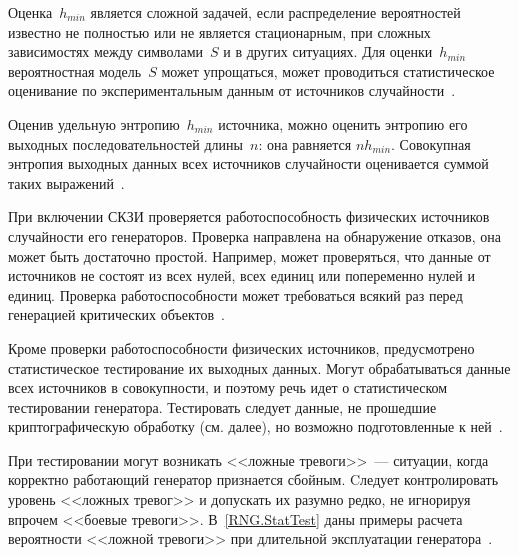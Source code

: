 Оценка~$h_{min}$ является сложной задачей, если распределение вероятностей 
известно не полностью или не является стационарным,
при сложных зависимостях между символами~$S$ и в других ситуациях.
%
Для оценки~$h_{min}$ вероятностная модель~$S$ может упрощаться,
может проводиться статистическое оценивание по экспериментальным
данным от источников случайности~.

Оценив удельную энтропию~$h_{min}$ источника, можно оценить 
энтропию его выходных последовательностей длины~$n$: она равняется 
$n h_{min}$. Совокупная энтропия выходных данных всех источников 
случайности оценивается суммой таких выражений~.

При включении СКЗИ проверяется работоспособность физических источников 
случайности его генераторов. Проверка направлена на обнаружение отказов, она 
может быть достаточно простой. Например, может проверяться, что данные от 
источников не состоят из всех нулей, всех единиц или попеременно нулей и 
единиц.
%
Проверка работоспособности может требоваться всякий раз перед генерацией 
критических объектов~.

Кроме проверки работоспособности физических источников, предусмотрено 
статистическое тестирование их выходных данных. Могут обрабатываться
данные всех источников в совокупности, и поэтому речь идет о статистическом 
тестировании генератора.
%
Тестировать следует данные, не прошедшие криптографическую обработку 
(см. далее), но возможно подготовленные к ней~.

При тестировании могут возникать <<ложные тревоги>>~--- ситуации, когда 
корректно работающий генератор признается сбойным. 
% 
Cледует контролировать уровень <<ложных тревог>> и допускать их разумно 
редко, не игнорируя впрочем <<боевые тревоги>>. 
%
%
В~\ref{RNG.StatTest} даны примеры расчета вероятности 
<<ложной тревоги>> при длительной эксплуатации генератора~.

